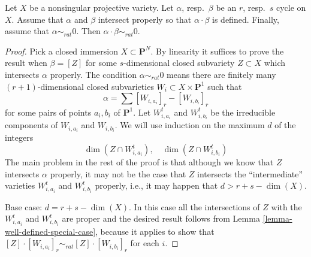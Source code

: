 %
\begin{theorem}
\label{theorem-well-defined}
Let $X$ be a nonsingular projective variety. Let $\alpha$, resp.\ $\beta$
be an $r$, resp.\ $s$ cycle on $X$. Assume that $\alpha$ and $\beta$
intersect properly so that $\alpha \cdot \beta$ is defined. Finally,
assume that $\alpha \sim_{rat} 0$. Then $\alpha \cdot \beta \sim_{rat} 0$.
\end{theorem}

\begin{proof}
Pick a closed immersion $X \subset \mathbf{P}^N$.
By linearity it suffices to prove the result when $\beta = [Z]$ for some
$s$-dimensional closed subvariety $Z \subset X$ which intersects $\alpha$
properly. The condition $\alpha \sim_{rat} 0$ means there
are finitely many $(r + 1)$-dimensional closed subvarieties
$W_i \subset X \times \mathbf{P}^1$ such that
$$
\alpha = \sum [W_{i, a_i}]_r - [W_{i, b_i}]_r
$$
for some pairs of points $a_i, b_i$ of $\mathbf{P}^1$.
Let $W_{i, a_i}^t$ and $W_{i, b_i}^t$ be the irreducible components
of $W_{i, a_i}$ and $W_{i, b_i}$.
We will use induction on the maximum $d$ of the integers
$$
\dim(Z \cap W_{i, a_i}^t),\quad \dim(Z \cap W_{i, b_i}^t)
$$
The main problem in the rest of the proof is that although we know that $Z$
intersects $\alpha$ properly, it may not be the case that $Z$ intersects the
``intermediate'' varieties $W_{i, a_i}^t$
and $W_{i, b_i}^t$ properly, i.e., it may happen that $d >  r + s - \dim(X)$.

\medskip\noindent
Base case: $d = r + s - \dim(X)$. In this case all the intersections of
$Z$ with the $W_{i, a_i}^t$ and $W_{i, b_i}^t$ are proper and the
desired result follows from Lemma \ref{lemma-well-defined-special-case},
because it applies to show that
$[Z] \cdot [W_{i, a_i}]_r \sim_{rat} [Z] \cdot [W_{i, b_i}]_r$ for
each $i$.


\end{proof}

